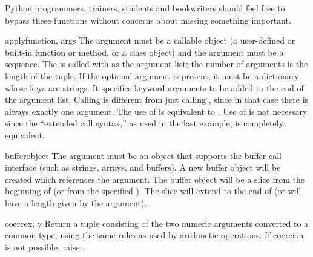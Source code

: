 Python programmers, trainers, students and bookwriters should feel free to
bypass these functions without concerns about missing something important.



\begin{funcdesc}{apply}{function, args}
  The  argument must be a callable object (a
  user-defined or built-in function or method, or a class object) and
  the  argument must be a sequence.  The  is
  called with  as the argument list; the number of arguments
  is the length of the tuple.
  If the optional  argument is present, it must be a
  dictionary whose keys are strings.  It specifies keyword arguments
  to be added to the end of the argument list.
  Calling  is different from just calling
  , since in that case there is always
  exactly one argument.  The use of  is equivalent
  to .
  Use of  is not necessary since the ``extended call
  syntax,'' as used in the last example, is completely equivalent.

\end{funcdesc}

\begin{funcdesc}{buffer}{object}
  The  argument must be an object that supports the buffer
  call interface (such as strings, arrays, and buffers).  A new buffer
  object will be created which references the  argument.
  The buffer object will be a slice from the beginning of 
  (or from the specified ). The slice will extend to the
  end of  (or will have a length given by the 
  argument).
\end{funcdesc}

\begin{funcdesc}{coerce}{x, y}
  Return a tuple consisting of the two numeric arguments converted to
  a common type, using the same rules as used by arithmetic
  operations. If coercion is not possible, raise .
\end{funcdesc}

